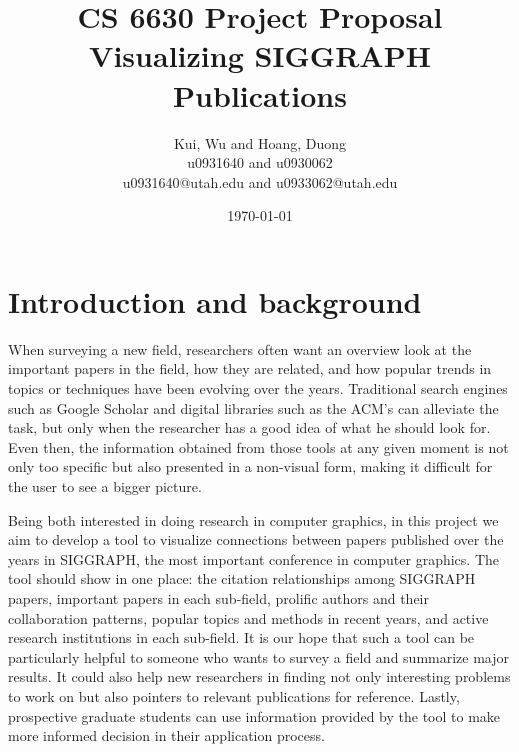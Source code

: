 \documentclass[dvips,12pt]{article}
\begin{document}

\title{CS 6630 Project Proposal\\Visualizing SIGGRAPH Publications}
\author{Kui, Wu and Hoang, Duong\\u0931640 and u0930062\\u0931640@utah.edu and u0933062@utah.edu}
\date{\today}



\maketitle

\section{Introduction and background}
When surveying a new field, researchers often want an overview look at the important papers in the field, how they are related, and how popular trends in topics or techniques have been evolving over the years. Traditional search engines such as Google Scholar and digital libraries such as the ACM's can alleviate the task, but only when the researcher has a good idea of what he should look for. Even then, the information obtained from those tools at any given moment is not only too specific but also presented in a non-visual form, making it difficult for the user to see a bigger picture.

Being both interested in doing research in computer graphics, in this project we aim to develop a tool to visualize connections between papers published over the years in SIGGRAPH, the most important conference in computer graphics. The tool should show in one place: the citation relationships among SIGGRAPH papers, important papers in each sub-field, prolific authors and their collaboration patterns, popular topics and methods in recent years, and active research institutions in each sub-field. It is our hope that such a tool can be particularly helpful to someone who wants to survey a field and summarize major results. It could also help new researchers in finding not only interesting problems to work on but also pointers to relevant publications for reference. Lastly, prospective graduate students can use information provided by the tool to make more informed decision in their application process.
\end{document}
